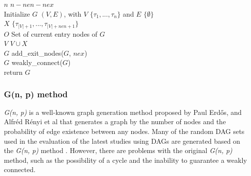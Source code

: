 \begin{algorithm}[t]
    {\footnotesize
        $n$ \la $n - nen - nex$ \\
        Initialize $G$ \la $(V, E)$, with $V$ \la $\{\tau_1, ..., \tau_{n}\}$ and $E$ \la $\{\emptyset\}$ \\
        $X$ \la $\{\tau_{|V|+1}, ..., \tau_{|V|+nen+1}\}$ \\
        $O$ \la Set of current entry nodes of $G$ \\
        $V$ \la $V \cup X$ \\
        $G$ \la add\_exit\_nodes($G$, $nex$) \\
        $G$ \la weakly\_connect($G$) \\
        return $G$
        \caption{{\it G(n, p)} method in MRDAG-Gen}
        \label{alg: g_n_p}
    }
\end{algorithm}


\subsubsection{G(n, p) method}
\label{sssec: g_n_p}

{\it G(n, p)} is a well-known graph generation method proposed by Paul Erd{\H{o}}s, and Alfr{\'e}d R{\'e}nyi et al \cite{cordeiro2010random} that generates a graph by the number of nodes and the probability of edge existence between any nodes.
Many of the random DAG sets used in the evaluation of the latest studies using DAGs are generated based on the {\it G(n, p)} method \cite{voronov2021ai, he2021response, guo2019energy, dong2019efficient}.
However, there are problems with the original {\it G(n, p)} method, such as the possibility of a cycle and the inability to guarantee a weakly connected.

